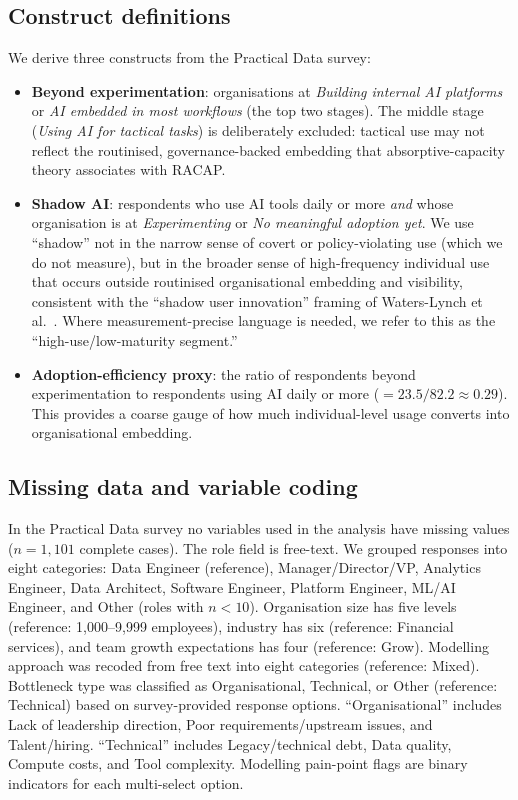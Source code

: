 \documentclass[twocolumn]{article}
\begin{document}
\subsection{Construct definitions}

We derive three constructs from the Practical Data survey:

\begin{itemize}
\item \textbf{Beyond experimentation}: organisations at \textit{Building internal AI platforms} or \textit{AI embedded in most workflows} (the top two stages). The middle stage (\textit{Using AI for tactical tasks}) is deliberately excluded: tactical use may not reflect the routinised, governance-backed embedding that absorptive-capacity theory associates with RACAP.
\item \textbf{Shadow AI}: respondents who use AI tools daily or more \textit{and} whose organisation is at \textit{Experimenting} or \textit{No meaningful adoption yet}. We use ``shadow'' not in the narrow sense of covert or policy-violating use (which we do not measure), but in the broader sense of high-frequency individual use that occurs outside routinised organisational embedding and visibility, consistent with the ``shadow user innovation'' framing of Waters-Lynch et al.~\cite{frey2024shadow}. Where measurement-precise language is needed, we refer to this as the ``high-use/low-maturity segment.''
\item \textbf{Adoption-efficiency proxy}: the ratio of respondents beyond experimentation to respondents using AI daily or more ($=23.5/82.2 \approx 0.29$). This provides a coarse gauge of how much individual-level usage converts into organisational embedding.
\end{itemize}

\subsection{Missing data and variable coding}

In the Practical Data survey no variables used in the analysis have missing values ($n{=}1{,}101$ complete cases). The role field is free-text. We grouped responses into eight categories: Data Engineer (reference), Manager/Director/VP, Analytics Engineer, Data Architect, Software Engineer, Platform Engineer, ML/AI Engineer, and Other (roles with $n{<}10$). Organisation size has five levels (reference: 1,000--9,999 employees), industry has six (reference: Financial services), and team growth expectations has four (reference: Grow). Modelling approach was recoded from free text into eight categories (reference: Mixed). Bottleneck type was classified as Organisational, Technical, or Other (reference: Technical) based on survey-provided response options. ``Organisational'' includes Lack of leadership direction, Poor requirements/upstream issues, and Talent/hiring. ``Technical'' includes Legacy/technical debt, Data quality, Compute costs, and Tool complexity. Modelling pain-point flags are binary indicators for each multi-select option.
\end{document}
